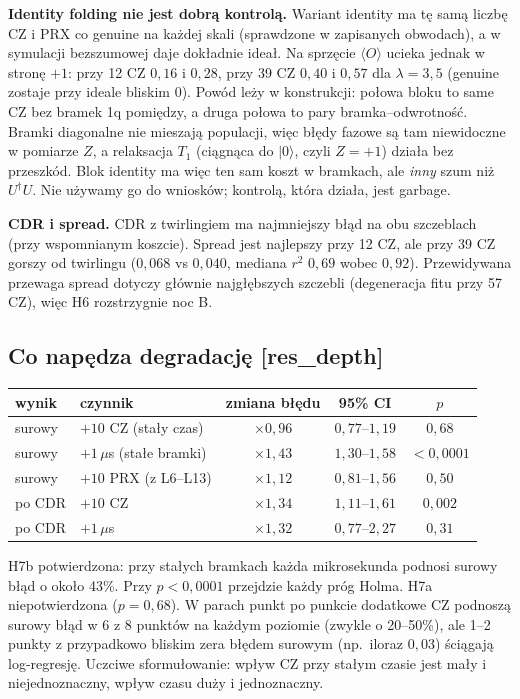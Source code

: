 \documentclass[11pt,a4paper]{article}
\newcommand{\slid}[1]{\hfill{\normalfont\small\ttfamily\color{axbluedk}[#1]}}
\newcommand{\ev}[1]{\langle #1\rangle}
\newcommand{\ket}[1]{|#1\rangle}
\begin{document}
\textbf{Identity folding nie jest dobrą kontrolą.} Wariant identity ma tę samą liczbę CZ i PRX co
genuine na każdej skali (sprawdzone w zapisanych obwodach), a w symulacji bezszumowej daje dokładnie
ideał. Na sprzęcie $\ev O$ ucieka jednak w stronę $+1$: przy 12 CZ $0{,}16$ i $0{,}28$, przy 39 CZ
$0{,}40$ i $0{,}57$ dla $\lambda=3,5$ (genuine zostaje przy ideale bliskim $0$). Powód leży w
konstrukcji: połowa bloku to same CZ bez bramek 1q pomiędzy, a druga połowa to pary
bramka--odwrotność. Bramki diagonalne nie mieszają populacji, więc błędy fazowe są tam niewidoczne w
pomiarze $Z$, a relaksacja $T_1$ (ciągnąca do $\ket0$, czyli $Z=+1$) działa bez przeszkód. Blok
identity ma więc ten sam koszt w bramkach, ale \emph{inny} szum niż $U^\dagger U$. Nie używamy go
do wniosków; kontrolą, która działa, jest garbage.

\textbf{CDR i spread.} CDR z twirlingiem ma najmniejszy błąd na obu szczeblach (przy wspomnianym
koszcie). Spread jest najlepszy przy 12 CZ, ale przy 39 CZ gorszy od twirlingu ($0{,}068$ vs
$0{,}040$, mediana $r^2$ $0{,}69$ wobec $0{,}92$). Przewidywana przewaga spread dotyczy głównie
najgłębszych szczebli (degeneracja fitu przy 57 CZ), więc H6 rozstrzygnie noc B.

\subsection{Co napędza degradację \slid{res\_depth}}

\begin{center}
\begin{tabular}{@{}llccc@{}}
\toprule
wynik & czynnik & zmiana błędu & 95\% CI & $p$ \\
\midrule
surowy & $+10$ CZ (stały czas) & $\times0{,}96$ & $0{,}77$--$1{,}19$ & $0{,}68$ \\
surowy & $+1\,\mu$s (stałe bramki) & $\times1{,}43$ & $1{,}30$--$1{,}58$ & $<0{,}0001$ \\
surowy & $+10$ PRX (z L6--L13) & $\times1{,}12$ & $0{,}81$--$1{,}56$ & $0{,}50$ \\
po CDR & $+10$ CZ & $\times1{,}34$ & $1{,}11$--$1{,}61$ & $0{,}002$ \\
po CDR & $+1\,\mu$s & $\times1{,}32$ & $0{,}77$--$2{,}27$ & $0{,}31$ \\
\bottomrule
\end{tabular}
\end{center}

H7b potwierdzona: przy stałych bramkach każda mikrosekunda podnosi surowy błąd o około 43\%. Przy
$p<0{,}0001$ przejdzie każdy próg Holma. H7a niepotwierdzona ($p=0{,}68$). W parach punkt po punkcie
dodatkowe CZ podnoszą surowy błąd w 6 z 8 punktów na każdym poziomie (zwykle o 20--50\%), ale 1--2
punkty z przypadkowo bliskim zera błędem surowym (np.\ iloraz $0{,}03$) ściągają log-regresję. Uczciwe
sformułowanie: wpływ CZ przy stałym czasie jest mały i niejednoznaczny, wpływ czasu duży i
jednoznaczny.
\end{document}

